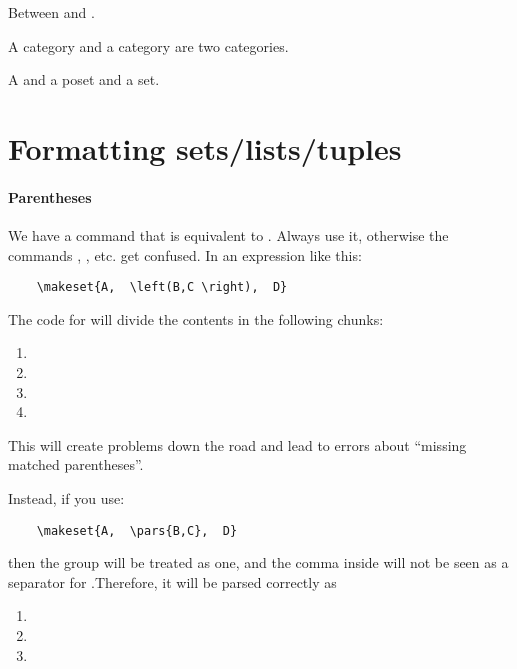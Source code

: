 Between \reals and \reals.

A category \Set and a category \SetL are two categories.

A  and a poset and a set.


\section{Formatting sets/lists/tuples}

\paragraph{Parentheses}

We have a command \str{\pars} that is equivalent to .
Always use it, otherwise the commands  \str{\makeset}, \str{\makelist}, etc. get confused.
In an expression like this:

\begin{verbatim}
    \makeset{A,  \left(B,C \right),  D}
\end{verbatim}

The code for \str{\makeset} will divide the contents in the following chunks:

\begin{enumerate}
    \item {}
    \item {}
    \item {}
    \item {}
\end{enumerate}
This will create problems down the road and lead to errors about ``missing matched parentheses''.

Instead, if you use:

\begin{verbatim}
    \makeset{A,  \pars{B,C},  D}
\end{verbatim}

then the group  will be treated as one, and the comma inside will not be seen as a separator for \str{\makeset}.Therefore, it will be parsed correctly as

\begin{enumerate}
    \item {}
    \item {}
    \item {}
\end{enumerate}

